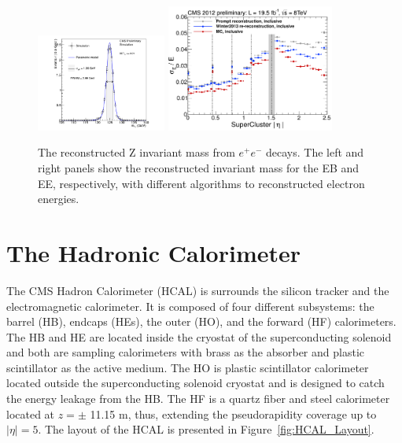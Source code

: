 \begin{figure}
 \centering
\includegraphics[width=0.38\textwidth]{CMS_DetectorFigures/ECAL_HiggsMassRes.pdf}
\includegraphics[width=0.49\textwidth]{CMS_DetectorFigures/EcalScaleEta_Incl.png}
\caption{The reconstructed Z invariant mass from $e^{+}e^{-}$
  decays. The left and right panels show the reconstructed invariant mass for
  the EB and EE, respectively, with different algorithms to reconstructed electron energies.\label{fig:ECAL_Higgs}}
\end{figure}
\section{The Hadronic Calorimeter}
The CMS Hadron Calorimeter (HCAL) is surrounds the silicon tracker and
the electromagnetic calorimeter. It is composed of four different
subsystems: the barrel (HB), endcaps (HEs), the outer (HO), and the
forward (HF) calorimeters. The HB and HE are located inside the
cryostat of the superconducting solenoid and both are sampling
calorimeters with brass as the absorber and plastic scintillator as
the active medium. The HO is plastic scintillator calorimeter located outside the superconducting
solenoid cryostat and is designed to catch the energy leakage from
the HB. The HF is a quartz fiber and steel calorimeter located at $z
=\pm$ 11.15 m, thus, extending the pseudorapidity coverage up to
$|\eta| = 5$. The layout of the HCAL is presented in
Figure~\ref{fig:HCAL_Layout}.


